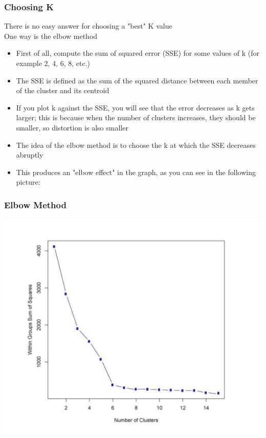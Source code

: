 \documentclass[compress, aspectratio=54]{beamer}
\begin{document}
\begin{frame}
\frametitle{Choosing K}
There is no easy answer for choosing a "best" K value\\
One way is the elbow method\\
\begin{itemize}
\item First of all, compute the sum of squared error (SSE) for some
values of k (for example 2, 4, 6, 8, etc.)
\item The SSE is defined as the sum of the squared distance
between each member of the cluster and its centroid
\item If you plot k against the SSE, you will see that the error
decreases as k gets larger; this is because when the number
of clusters increases, they should be smaller, so distortion is
also smaller
\item The idea of the elbow method is to choose the k at which the
SSE decreases abruptly
\item This produces an "elbow effect" in the graph, as you can see
in the following picture:
\end{itemize}

\end{frame}

\begin{frame}
\frametitle{Elbow Method}
\centering 
\includegraphics[width=0.65\linewidth ]{Figures/elbow_method.png}


\end{frame}
\end{document}
